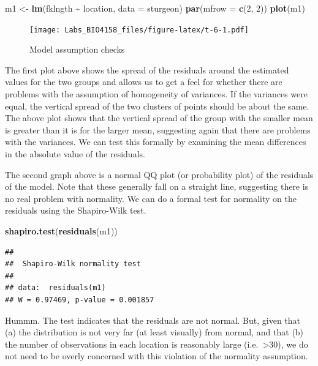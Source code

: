 \documentclass[
  12pt,
]{book}
\newenvironment{Shaded}{\begin{snugshade}}{\end{snugshade}}
\newcommand{\DataTypeTok}[1]{\textcolor[rgb]{0.13,0.29,0.53}{#1}}
\newcommand{\DecValTok}[1]{\textcolor[rgb]{0.00,0.00,0.81}{#1}}
\newcommand{\KeywordTok}[1]{\textcolor[rgb]{0.13,0.29,0.53}{\textbf{#1}}}
\newcommand{\NormalTok}[1]{#1}
\newcommand{\OperatorTok}[1]{\textcolor[rgb]{0.81,0.36,0.00}{\textbf{#1}}}
\newcommand{\StringTok}[1]{\textcolor[rgb]{0.31,0.60,0.02}{#1}}
\begin{document}
\begin{Shaded}
\begin{Highlighting}[]
\NormalTok{m1 \textless{}{-}}\StringTok{ }\KeywordTok{lm}\NormalTok{(fklngth }\OperatorTok{\textasciitilde{}}\StringTok{ }\NormalTok{location, }\DataTypeTok{data =}\NormalTok{ sturgeon)}
\KeywordTok{par}\NormalTok{(}\DataTypeTok{mfrow =} \KeywordTok{c}\NormalTok{(}\DecValTok{2}\NormalTok{, }\DecValTok{2}\NormalTok{))}
\KeywordTok{plot}\NormalTok{(m1)}
\end{Highlighting}
\end{Shaded}

\begin{figure}
\centering
\texttt{[image: Labs\_BIO4158\_files/figure-latex/t-6-1.pdf]}
\caption{\label{fig:t-6}Model assumption checks}
\end{figure}

The first plot above shows the spread of the residuals around the estimated values for the two groups and allows us to get a feel for whether there are problems with the assumption of homogeneity of variances. If the variances were equal, the vertical spread of the two clusters of points should be about the same. The above plot shows that the vertical spread of the group with the smaller mean is greater than it is for the larger mean, suggesting again that there are problems with the variances. We can test this formally by examining the mean differences in the absolute value of the residuals.

The second graph above is a normal QQ plot (or probability plot) of the residuals of the model. Note that these generally fall on a straight line, suggesting there is no real problem with normality. We can do a formal test for normality on the residuals using the Shapiro-Wilk test.

\begin{Shaded}
\begin{Highlighting}[]
\KeywordTok{shapiro.test}\NormalTok{(}\KeywordTok{residuals}\NormalTok{(m1))}
\end{Highlighting}
\end{Shaded}

\begin{verbatim}
## 
##  Shapiro-Wilk normality test
## 
## data:  residuals(m1)
## W = 0.97469, p-value = 0.001857
\end{verbatim}

Hummm. The test indicates that the residuals are not normal. But, given that (a) the distribution is not very far (at least visually) from normal, and that (b) the number of observations in each location is reasonably large (i.e.~\textgreater30), we do not need to be overly concerned with this violation of the normality assumption.
\end{document}
